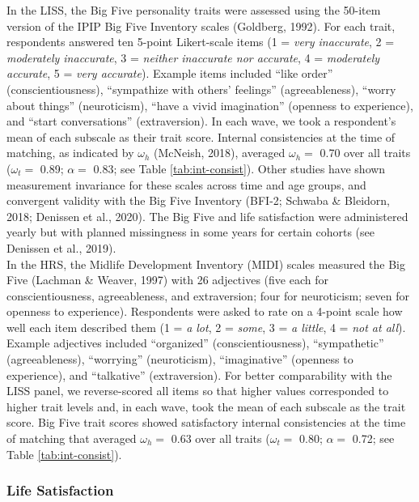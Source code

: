 \documentclass[
  english,
  man,floatsintext]{apa7}
\begin{document}
In the LISS, the Big Five personality traits were assessed using the 50-item version of the IPIP Big Five Inventory scales (Goldberg, 1992). For each trait, respondents answered ten 5-point Likert-scale items (1 = \emph{very inaccurate}, 2 = \emph{moderately inaccurate}, 3 = \emph{neither inaccurate nor accurate}, 4 = \emph{moderately accurate}, 5 = \emph{very accurate}). Example items included \enquote{like order} (conscientiousness), \enquote{sympathize with others' feelings} (agreeableness), \enquote{worry about things} (neuroticism), \enquote{have a vivid imagination} (openness to experience), and \enquote{start conversations} (extraversion). In each wave, we took a respondent's mean of each subscale as their trait score. Internal consistencies at the time of matching, as indicated by \(\omega_h\) (McNeish, 2018), averaged \(\omega_h =\) 0.70 over all traits (\(\omega_t =\) 0.89; \(\alpha =\) 0.83; see Table \ref{tab:int-consist}). Other studies have shown measurement invariance for these scales across time and age groups, and convergent validity with the Big Five Inventory (BFI-2; Schwaba \& Bleidorn, 2018; Denissen et al., 2020). The Big Five and life satisfaction were administered yearly but with planned missingness in some years for certain cohorts (see Denissen et al., 2019). \\
In the HRS, the Midlife Development Inventory (MIDI) scales measured the Big Five (Lachman \& Weaver, 1997) with 26 adjectives (five each for conscientiousness, agreeableness, and extraversion; four for neuroticism; seven for openness to experience). Respondents were asked to rate on a 4-point scale how well each item described them (1 = \emph{a lot}, 2 = \emph{some}, 3 = \emph{a little}, 4 = \emph{not at all}). Example adjectives included \enquote{organized} (conscientiousness), \enquote{sympathetic} (agreeableness), \enquote{worrying} (neuroticism), \enquote{imaginative} (openness to experience), and \enquote{talkative} (extraversion). For better comparability with the LISS panel, we reverse-scored all items so that higher values corresponded to higher trait levels and, in each wave, took the mean of each subscale as the trait score. Big Five trait scores showed satisfactory internal consistencies at the time of matching that averaged \(\omega_h =\) 0.63 over all traits (\(\omega_t =\) 0.80; \(\alpha =\) 0.72; see Table \ref{tab:int-consist}).

\hypertarget{life-satisfaction}{%
\subsubsection{Life Satisfaction}\label{life-satisfaction}}
\end{document}
